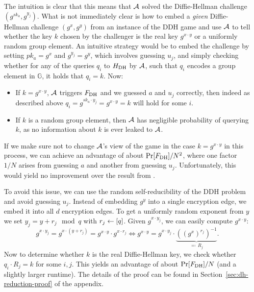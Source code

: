 The intuition is clear that this means that $\mathcal{A}$ solved the Diffie-Hellman challenge $(g^{sk_a}, g^{y_j})$. What is not immediately clear is how to embed a \emph{given} Diffie-Hellman challenge $(g^x, g^y)$ from an instance of the DDH game and use $\mathcal{A}$ to tell whether the key $k$ chosen by the challenger is the real key $g^{x \cdot y}$ or a uniformly random group element.
An intuitive strategy would be to embed the challenge by setting $pk_a = g^x$ and $g^{y_j} = g^y$, which involves guessing $u_j$, and simply checking whether for any of the queries $q_i$ to $H_\mathrm{DH}$ by $\mathcal{A}$, such that $q_i$ encodes a group element in $\mathbb{G}$, it holds that $q_i = k$. Now:
\begin{itemize}
	\item If $k = g^{x \cdot y}$, $\mathcal{A}$ triggers $F_\mathrm{DH}$ and we guessed $a$ and $u_j$ correctly, then indeed as described above $q_i = g^{sk_a \cdot y_j} = g^{x \cdot y} = k$ will hold for some $i$.
	\item If $k$ is a random group element, then $\mathcal{A}$ has negligible probability of querying $k$, as no information about $k$ is ever leaked to $\mathcal{A}$.
\end{itemize}
If we make sure not to change $\mathcal{A}$'s view of the game in the case $k = g^{x \cdot y}$ in this process, we can achieve an advantage of about $\pr{\fdh} / N^2$, where one factor $1/N$ arises from guessing $a$ and another from guessing $u_j$. Unfortunately, this would yield no improvement over the result from \cite{ttkem}.

To avoid this issue, we can use the random self-reducibility of the DDH problem and avoid guessing $u_j$. Instead of embedding $g^y$ into a single encryption edge, we embed it into all $d$ encryption edges. To get a uniformly random exponent from $y$ we set $y_j = y + r_j \mod q$ with $r_j \leftarrow [q]$. Given $g^{x \cdot y_j}$, we can easily compute $g^{x \cdot y}$:
\[
	g^{x \cdot y_j} = g^{x \cdot (y + r_j)} = g^{x \cdot y}	\cdot g^{x \cdot r_j} \iff g^{x \cdot y} = g^{x \cdot y_j} \cdot \underbrace{((g^x)^{r_j})^{-1}}_{\eqqcolon \, R_j}.
\]
Now to determine whether $k$ is the real Diffie-Hellman key, we check whether $q_i \cdot R_j = k$ for some $i, j$. This yields an advantage of about $\pr{\fdh} / N$ (and a slightly larger runtime). The details of the proof can be found in Section~\ref{sec:dh-reduction-proof} of the appendix.

